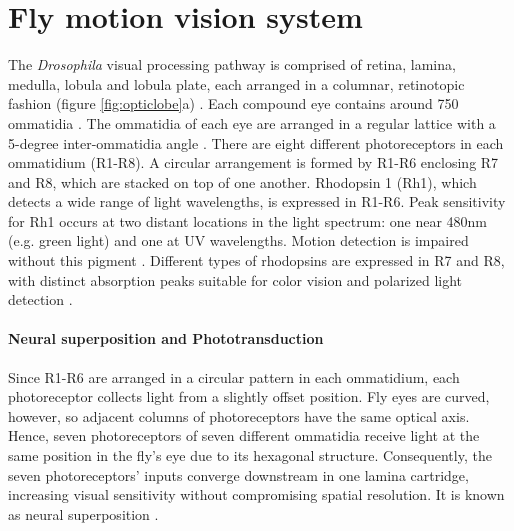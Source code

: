 \section{Fly motion vision system}
The \textit{Drosophila} visual processing pathway is comprised of retina, lamina, medulla, lobula and lobula plate, each arranged in a columnar, retinotopic fashion (figure \ref{fig:opticlobe}a) \parencite{Fischbach1989}. Each compound eye contains around 750 ommatidia \parencite{Ready1976}. The ommatidia of each eye are arranged in a regular lattice with a 5-degree inter-ommatidia angle \parencite{Land1997}. There are eight different photoreceptors in each ommatidium (R1-R8). A circular arrangement is formed by R1-R6 enclosing R7 and R8, which are stacked on top of one another. Rhodopsin 1 (Rh1), which detects a wide range of light wavelengths, is expressed in R1-R6. Peak sensitivity for Rh1 occurs at two distant locations in the light spectrum: one near 480nm (e.g. green light) and one at UV wavelengths. Motion detection is impaired without this pigment \parencite{Rister2007}. Different types of rhodopsins are expressed in R7 and R8, with distinct absorption peaks suitable for color vision and polarized light detection \parencite{Yamaguchi2008, Wernet2004}.

\paragraph{Neural superposition and Phototransduction}
Since R1-R6 are arranged in a circular pattern in each ommatidium, each photoreceptor collects light from a slightly offset position. Fly eyes are curved, however, so adjacent columns of photoreceptors have the same optical axis. Hence, seven photoreceptors of seven different ommatidia receive light at the same position in the fly's eye due to its hexagonal structure. Consequently, the seven photoreceptors' inputs converge downstream in one lamina cartridge, increasing visual sensitivity without compromising spatial resolution. It is known as neural superposition \parencite{Kirschfeld1967}.

